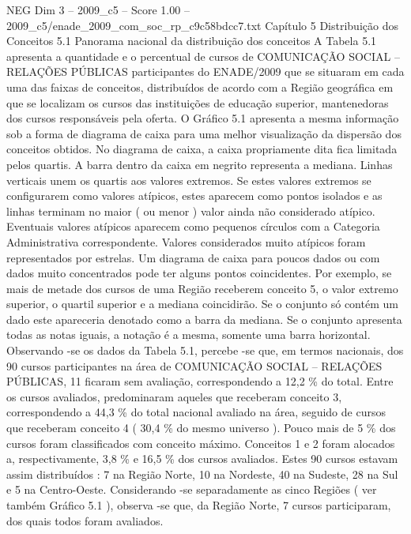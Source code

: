 \begin{textsample}{NEG Dim 3 – 2009\_c5 – Score 1.00 – 2009\_c5/enade\_2009\_com\_soc\_rp\_c9c58bdcc7.txt}  \label{ex:f3_neg_108}
Capítulo 5 Distribuição dos Conceitos 5.1 Panorama nacional da distribuição dos conceitos A Tabela 5.1 apresenta a quantidade e o percentual de cursos de COMUNICAÇÃO SOCIAL – RELAÇÕES PÚBLICAS participantes do ENADE/2009 que se situaram em cada uma das faixas de conceitos, distribuídos de acordo com a Região geográfica em que se localizam os cursos das instituições de educação superior, mantenedoras dos cursos responsáveis pela oferta.
O Gráfico 5.1 apresenta a mesma informação sob a forma de diagrama de caixa para uma melhor visualização da dispersão dos conceitos obtidos.
No diagrama de caixa, a caixa propriamente dita fica limitada pelos quartis.
A barra dentro da caixa em negrito representa a mediana.
Linhas verticais unem os quartis aos valores extremos.
Se estes valores extremos se configurarem como valores atípicos, estes aparecem como pontos isolados e as linhas terminam no maior ( ou menor ) valor ainda não considerado atípico.
Eventuais valores atípicos aparecem como pequenos círculos com a Categoria Administrativa correspondente.
Valores considerados muito atípicos foram representados por estrelas.
Um diagrama de caixa para poucos dados ou com dados muito concentrados pode ter alguns pontos coincidentes.
Por exemplo, se mais de metade dos cursos de uma Região receberem conceito 5, o valor extremo superior, o quartil superior e a mediana coincidirão.
Se o conjunto só contém um dado este apareceria denotado como a barra da mediana.
Se o conjunto apresenta todas as notas iguais, a notação é a mesma, somente uma barra horizontal.
Observando -se os dados da Tabela 5.1, percebe -se que, em termos nacionais, dos 90 cursos participantes na área de COMUNICAÇÃO SOCIAL – RELAÇÕES PÚBLICAS, 11 ficaram sem avaliação, correspondendo a 12,2 \% do total.
Entre os cursos avaliados, predominaram aqueles que receberam conceito 3, correspondendo a 44,3 \% do total nacional avaliado na área, seguido de cursos que receberam conceito 4 ( 30,4 \% do mesmo universo ).
Pouco mais de 5 \% dos cursos foram classificados com conceito máximo.
Conceitos 1 e 2 foram alocados a, respectivamente, 3,8 \% e 16,5 \% dos cursos avaliados.
Estes 90 cursos estavam assim distribuídos : 7 na Região Norte, 10 na Nordeste, 40 na Sudeste, 28 na Sul e 5 na Centro-Oeste.
Considerando -se separadamente as cinco Regiões ( ver também Gráfico 5.1 ), observa -se que, da Região Norte, 7 cursos participaram, dos quais todos foram avaliados.

\end{textsample}
